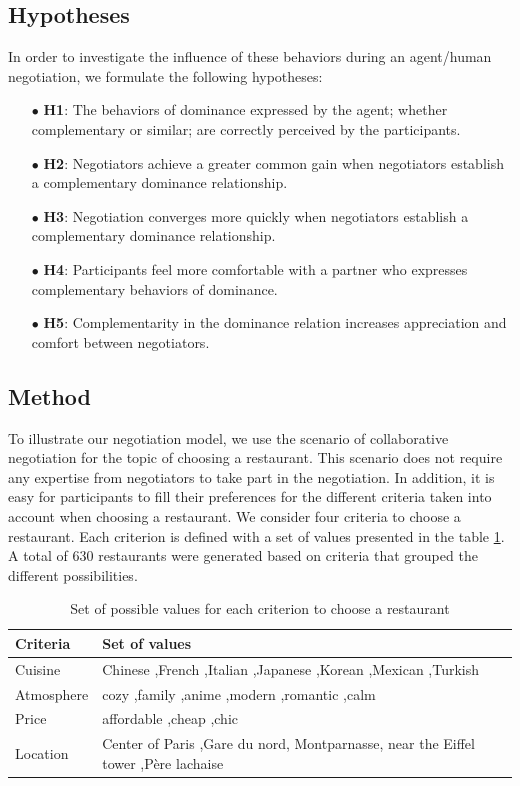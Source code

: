 \documentclass{llncs}
\begin{document}
	\subsection{Hypotheses}	
	In order to investigate the influence of these behaviors during an agent/human negotiation, we formulate the following hypotheses: 
	
	
	\begin{itemize}
		\item [$\bullet$] \textbf{H1}: The behaviors of dominance expressed by the agent; whether complementary or similar; are correctly perceived by the participants.
		\item [$\bullet$] \textbf{H2}: Negotiators achieve a greater common gain when negotiators establish a complementary dominance relationship.
		\item [$\bullet$] \textbf{H3}: Negotiation converges more quickly when negotiators establish a complementary dominance relationship. 
		\item [$\bullet$] \textbf{H4}: Participants feel more comfortable with a partner who expresses complementary behaviors of dominance.
		\item [$\bullet$] \textbf{H5}: Complementarity in the dominance relation increases appreciation and comfort between negotiators.
		
	\end{itemize}
	
	\subsection{Method}
	\label{sec:methodo}
	
	To illustrate our negotiation model, we use the scenario of collaborative negotiation for the topic of choosing a restaurant.
	This scenario does not require any expertise from negotiators to take part in the negotiation. 
	In addition, it is easy for participants to fill their preferences for the different criteria taken into account when choosing a restaurant.
	We consider four criteria to choose a restaurant. Each criterion is defined with a set of values presented in the table \ref{tab:valuesCriteria}. A total of 630 restaurants were generated based on criteria that grouped the different possibilities.
	
	\begin{table}[h]
		\caption{Set of possible values for each criterion to choose a restaurant}
		\label{tab:valuesCriteria}
		\centering
		\begin{tabular}{p{1.6cm}| p{5.5cm}}
			\hline
			\hline
			\textbf{Criteria} & \textbf{Set of values} \\
			\hline
			Cuisine & Chinese ,French ,Italian ,Japanese ,Korean ,Mexican ,Turkish \\
			\hline
			Atmosphere & cozy ,family ,anime ,modern ,romantic ,calm \\
			\hline 
			Price & affordable ,cheap ,chic \\
			\hline
			Location & Center of Paris ,Gare du nord, Montparnasse, near the Eiffel tower ,Père lachaise \\
			\hline
			\hline
		\end{tabular}
	\end{table}
	
\end{document}
